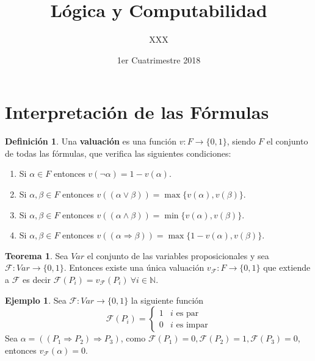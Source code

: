 \documentclass[a4paper,11pt]{article}
\title{Lógica y Computabilidad}
\author{XXX}
\date{1er Cuatrimestre 2018}
\theoremstyle{definition}
\newtheorem{defn}{Definición}[section]
\newtheorem{exap}{Ejemplo}[section]
\newtheorem{teor}{Teorema}[section]
\theoremstyle{remark}
\begin{document}
\maketitle

\section{Interpretación de las Fórmulas}

\begin{defn}
Una \textbf{valuación} es una función $v : F \to \{0, 1\}$, siendo $F$ el conjunto de todas
las fórmulas, que verifica las siguientes condiciones:

\begin{enumerate}[label=\emph{\alph*})]
\item Si $\alpha \in F$  entonces $v(\neg \alpha) = 1 - v(\alpha)$.
\item Si $\alpha, \beta \in F$ entonces $v((\alpha\vee\beta)) = \max\{v(\alpha), v(\beta)\}$.
\item Si $\alpha, \beta \in F$ entonces $v((\alpha\wedge\beta)) = \min\{v(\alpha), v(\beta)\}$.
\item Si $\alpha, \beta \in F$ entonces $v((\alpha\Rightarrow\beta)) = \max\{1 - v(\alpha), v(\beta)\}$.
\end{enumerate}
\end{defn}

\begin{teor}
Sea $Var$ el conjunto de las variables proposicionales y sea $\mathcal F : Var \to \{0, 1\}$. Entonces
existe una única valuación $v_{\mathcal F} : F \to \{0, 1\}$ que extiende a $\mathcal F$ es decir
$\mathcal F(P_i) = v_{\mathcal F}(P_i)\ \forall i \in \mathbb N$.
\end{teor}

\begin{exap}
Sea $\mathcal F : Var \to \{0, 1\}$ la siguiente función 
\[\mathcal F(P_i) = \begin{cases}
1 & i \text{ es par} \\
0 & i \text{ es impar}
\end{cases} \]
Sea $\alpha = ((P_1 \Rightarrow P_2) \Rightarrow P_3)$, como $\mathcal F(P_1) = 0, \mathcal F(P_2) = 1, 
\mathcal F(P_3) = 0$, entonces $v_{\mathcal F}(\alpha) = 0$.
\end{exap}
\end{document}
